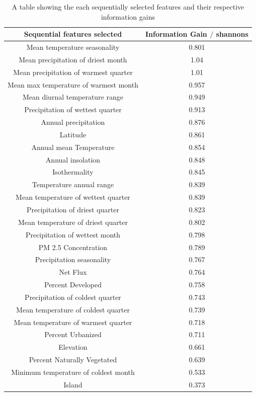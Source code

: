 \documentclass[prl,showpacs,superscriptaddress,twocolumn,longbibliography]{revtex4-1}
\begin{document}
\begin{table}[h]
\begin{center}
\begin{tabular}{| c |  c |}
\hline
Sequential features selected & Information Gain $/$ shannons \\
 \hline
 Mean temperature seasonality & 0.801\\ 
 Mean precipitation of driest month & 1.04\\
 Mean precipitation of warmest quarter &  1.01\\
 Mean max temperature of warmest month &  0.957\\
 Mean diurnal temperature range & 0.949\\
 Precipitation of wettest quarter & 0.913\\
 Annual precipitation & 0.876\\
 Latitude & 0.861\\
 Annual mean Temperature & 0.854\\
 Annual insolation & 0.848\\ 
 Isothermality & 0.845\\
 Temperature annual range & 0.839\\
 Mean temperature of wettest quarter & 0.839\\
 Precipitation of driest quarter & 0.823\\
 Mean temperature of driest quarter & 0.802\\
 Precipitation of wettest month & 0.798\\
 PM 2.5 Concentration & 0.789\\
 Precipitation seasonality & 0.767\\
 Net Flux & 0.764\\
 Percent Developed & 0.758\\
 Precipitation of coldest quarter & 0.743\\
 Mean temperature of coldest quarter & 0.739\\
 Mean temperature of warmest quarter & 0.718\\
 Percent Urbanized & 0.711\\
 Elevation & 0.661\\
 Percent Naturally Vegetated & 0.639\\
 Minimum temperature of coldest month & 0.533\\
 Island & 0.373\\
 \hline
\end{tabular}
\end{center}
\caption{A table showing the each sequentially selected features and their respective information gains}
\end{table}
\end{document}
